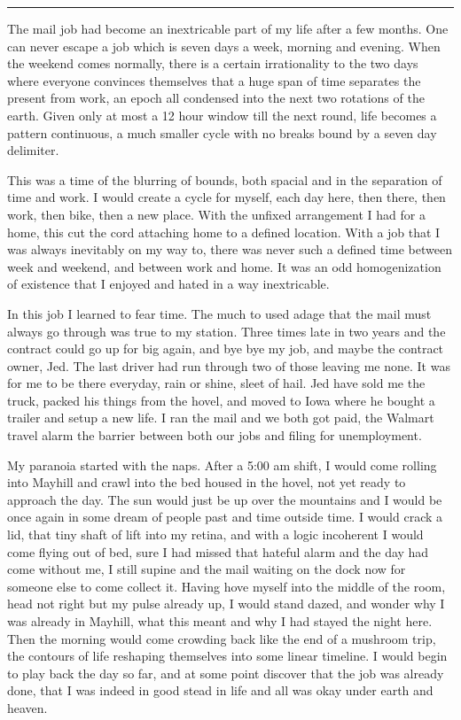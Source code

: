 \documentclass[ebook, 10pt, openright, onecolumn]{memoir}
\newcommand*\starbreak{\fancybreak*{\Large{* * *}}}
\begin{document}
\starbreak

The mail job had become an inextricable part of my life after a few months.  One
can never escape a job which is seven days a week, morning and evening.  When
the weekend comes normally, there is a certain irrationality to the two days
where everyone convinces themselves that a huge span of time separates the
present from work, an epoch all condensed into the next two rotations of the
earth.  Given only at most a 12 hour window till the next round, life becomes a
pattern continuous, a much smaller cycle with no breaks bound by a seven day
delimiter.

This was a time of the blurring of bounds, both spacial and in the separation of
time and work.  I would create a cycle for myself, each day here, then there,
then work, then bike, then a new place.  With the unfixed arrangement I had for
a home, this cut the cord attaching home to a defined location.  With a job that
I was always inevitably on my way to, there was never such a defined time
between week and weekend, and between work and home.  It was an odd
homogenization of existence that I enjoyed and hated in a way inextricable. 

In this job I learned to fear time.  The much to used adage that the mail must
always go through was true to my station. Three times late in two years and the
contract could go up for big again, and bye bye my job, and maybe the contract
owner, Jed.  The last driver had run through two of those leaving me none.  It
was for me to be there everyday, rain or shine, sleet of hail.  Jed have sold me
the truck, packed his things from the hovel, and moved to Iowa where he bought a
trailer and setup a new life.  I ran the mail and we both got paid, the Walmart
travel alarm the barrier between both our jobs and filing for unemployment.

My paranoia started with the naps.  After a 5:00 am shift, I would come rolling
into Mayhill and crawl into the bed housed in the hovel, not yet ready to
approach the day.  The sun would just be up over the mountains and I would be
once again in some dream of people past and time outside time.  I would crack a
lid, that tiny shaft of lift into my retina, and with a logic incoherent I would
come flying out of bed, sure I had missed that hateful alarm and the day had
come without me, I still supine and the mail waiting on the dock now for someone
else to come collect it.  Having hove myself into the middle of the room, head
not right but my pulse already up, I would stand dazed, and wonder why I was
already in Mayhill, what this meant and why I had stayed the night here.  Then
the morning would come crowding back like the end of a mushroom trip, the
contours of life reshaping themselves into some linear timeline.  I would begin
to play back the day so far, and at some point discover that the job was already
done, that I was indeed in good stead in life and all was okay under earth and
heaven.
\end{document}
